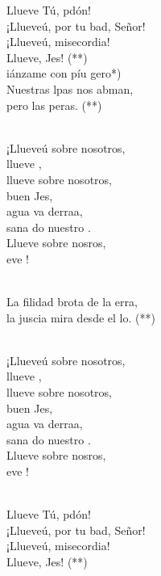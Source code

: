\begin{cancion}%
	Llueve Tú, pdón!\\
	¡Llueveú, por tu bad, Señor!\\
	¡Llueveú, misecordia!\\
	Llueve, Jes! (**)  \\
	iánzame con píu gero*) \\
	Nuestras lpas nos abman,\\
	pero  las peras. (**) \\\jump\\
	\begin{chorus}%
	¡Llueveú sobre nosotros,\\
	llueve , \\
	llueve  sobre nosotros, \\
	buen Jes,\\
	agua va derraa,\\
	sana do nuestro .\\
	Llueve  sobre nosros, \\
	eve ! \\
	\end{chorus}%
	\jump\\
	La filidad brota de la erra,\\
	la juscia mira desde el lo. (**)\\\jump\\
	\begin{chorus}%
	¡Llueveú sobre nosotros,\\
	llueve , \\
	llueve  sobre nosotros, \\
	buen Jes,\\
	agua va derraa,\\
	sana do nuestro .\\
	Llueve  sobre nosros, \\
	eve ! \\
	\end{chorus}%
	\jump\\
	Llueve Tú, pdón!\\
	¡Llueveú, por tu bad, Señor!\\
	¡Llueveú, misecordia!\\
	Llueve, Jes! (**)  \\
\end{cancion}%
